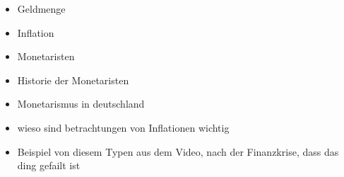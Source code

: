 \documentclass[
	12pt,
	BCOR=5mm,
	DIV=12,
	headinclude=on,
	footinclude=off,
	parskip=half,
	bibliography=totoc,
	listof=entryprefix,
	toc=listof,
	numbers=noenddot,
]{scrreprt}
\begin{document}
\begin{itemize}
    \item Geldmenge
    \item Inflation
    \item Monetaristen
    \item Historie der Monetaristen
    \item Monetarismus in deutschland
    \item wieso sind betrachtungen von Inflationen wichtig
    \item Beispiel von diesem Typen aus dem Video, nach der Finanzkrise, dass das ding gefailt ist
\end{itemize}

\printbibliography[title=Literaturverzeichnis]
\end{document}
